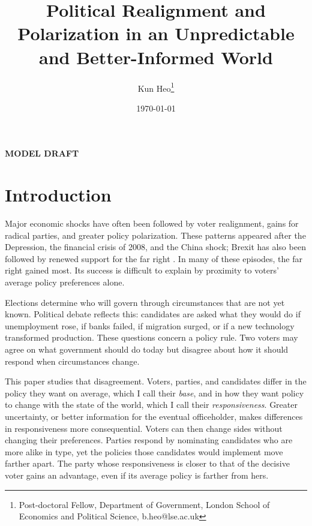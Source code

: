 \documentclass[12pt,letterpaper]{article}
\begin{document}
\begin{titlepage}
\title{\Large Political Realignment and Polarization in an Unpredictable and Better-Informed World}
\author{Kun Heo\footnote{Post-doctoral Fellow, Department of Government, London School of Economics and Political Science, b.heo@lse.ac.uk}}
\date{\today}
\maketitle
\begin{center}\textbf{MODEL DRAFT}\end{center}
\thispagestyle{empty}
\setcounter{page}{0}
\end{titlepage}


\section{Introduction}

Major economic shocks have often been followed by voter realignment, gains for radical parties, and greater policy polarization. These patterns appeared after the Depression, the financial crisis of 2008, and the China shock; Brexit has also been followed by renewed support for the far right \citep{King2008,Funke2016,Autor2020,GurievPapaioannou2022,BornEtAl2019,Curtice2025}. In many of these episodes, the far right gained most. Its success is difficult to explain by proximity to voters' average policy preferences alone.

Elections determine who will govern through circumstances that are not yet known. Political debate reflects this: candidates are asked what they would do if unemployment rose, if banks failed, if migration surged, or if a new technology transformed production. These questions concern a policy rule. Two voters may agree on what government should do today but disagree about how it should respond when circumstances change.

This paper studies that disagreement. Voters, parties, and candidates differ in the policy they want on average, which I call their \emph{base}, and in how they want policy to change with the state of the world, which I call their \emph{responsiveness}. Greater uncertainty, or better information for the eventual officeholder, makes differences in responsiveness more consequential. Voters can then change sides without changing their preferences. Parties respond by nominating candidates who are more alike in type, yet the policies those candidates would implement move farther apart. The party whose responsiveness is closer to that of the decisive voter gains an advantage, even if its average policy is farther from hers.
\end{document}

